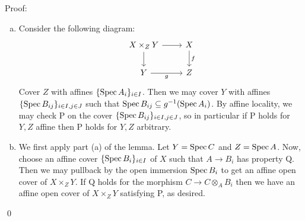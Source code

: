 \documentclass{article}
\begin{document}
Proof:
\begin{enumerate}[a.]
      \item Consider the following diagram: \[\begin{tikzcd}
                        {X\times_ZY} & X                                                   \\
                        Y            & Z \arrow[from=1-1, to=2-1] \arrow[from=1-1, to=1-2]
                        \arrow["g"', from=2-1, to=2-2] \arrow["f", from=1-2, to=2-2]
                  \end{tikzcd}\] Cover
            $Z$ with affines $\{\operatorname{Spec} A_i\}_{i \in I}$. Then we may cover
            $Y$ with affines $\{\operatorname{Spec} B_{ij}\}_{i \in I, j \in J}$ such that
            $\operatorname{Spec} B_{ij} \subseteq
                  g^{-1}(\operatorname{Spec} A_i)$. By affine locality, we may check P on the cover
            $\{\operatorname{Spec} B_{ij}\}_{i \in I, j \in J}$, so in particular if P holds for $Y, Z$
            affine then P holds for $Y, Z$ arbitrary.
      \item We first apply part (a) of the lemma. Let $Y=\operatorname{Spec} C$ and
            $Z=\operatorname{Spec} A$. Now, choose an affine cover $\{\operatorname{Spec} B_i\}_{i \in I}$ of
            $X$ such that $A \to B_i$ has property Q. Then we
            may pullback by the open immersion $\operatorname{Spec} B_i$ to get an affine open
            cover of $X \times_Z Y$. If Q holds for the morphism
            $C \to C \otimes_A B_i$ then we have an affine open cover of
            $X \times_ZY$ satisfying P, as desired.
\end{enumerate} \qed
\end{document}
